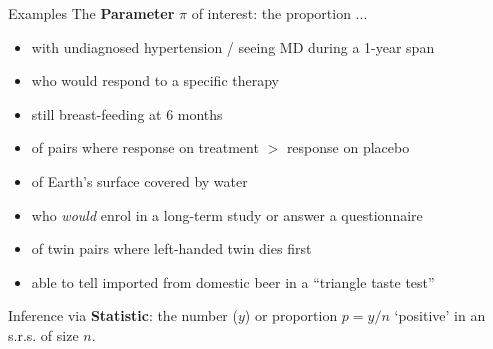 \documentclass[10pt]{beamer}\usepackage[]{graphicx}\usepackage[]{color}
\begin{document}
\begin{frame}{Examples}
	\small 
	The \textbf{Parameter} $\pi$ of interest: the proportion ...
	\begin{itemize}
		\item with undiagnosed hypertension / seeing MD during a 1-year span 
		\item who would respond to a specific therapy 
		\item still breast-feeding at 6 months
		\item of pairs where response on treatment $>$  response on placebo
		\item of Earth's surface covered by water
		\item who \textit{would} enrol in a long-term study or answer a questionnaire
		\item of twin pairs where left-handed twin dies first
		\item able to tell imported from domestic beer in a ``triangle taste test''
	\end{itemize}
	
	Inference via \textbf{Statistic}: the number ($y$) or proportion $p = y/n$ `positive' in an s.r.s. of size $n$.
	
\end{frame}

\end{document}
